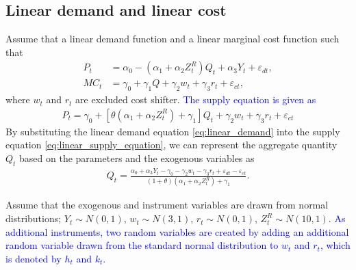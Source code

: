 \documentclass[11pt, a4paper]{article}
\begin{document}
\subsection{Linear demand and linear cost}
Assume that a linear demand function and a linear marginal cost function such that
\begin{align}
    P_t &= \alpha_0 - (\alpha_1 + \alpha_2Z^R_t)Q_t + \alpha_3 Y_t + \varepsilon_{dt},\label{eq:linear_demand}\\
    MC_t &= \gamma_0  + \gamma_1 Q + \gamma_2 w_t + \gamma_3 r_t + \varepsilon_{ct},\label{eq:linear_marginal_cost}
\end{align}
where $w_t$ and $r_t$ are excluded cost shifter.
\textcolor{blue}{The supply equation is given as}
\begin{align}
    P_t = \gamma_0 + [\theta(\alpha_1 + \alpha_2Z^R_t)+ \gamma_1] Q_t   + \gamma_2 w_t + \gamma_3 r_t + \varepsilon_{ct}\label{eq:linear_supply_equation}
\end{align}
By substituting the linear demand equation \eqref{eq:linear_demand} into the supply equation \eqref{eq:linear_supply_equation}, we can represent the aggregate quantity $Q_t$ based on the parameters and the exogenous variables as   
\begin{align}
    Q_t =  \frac{\alpha_0 + \alpha_3 Y_t - \gamma_0 - \gamma_2 w_t - \gamma_3 r_t + \varepsilon_{dt} - \varepsilon_{ct}}{(1 + \theta) (\alpha_1 + \alpha_2Z^R_t) + \gamma_1}.
\end{align}

Assume that the exogenous and instrument variables are drawn from normal distributions; $ Y_t \sim N(0,1)$, $w_t \sim N (3, 1)$, $r_t \sim N (0, 1)$, $ Z^R_t \sim N (10, 1)$.
\textcolor{blue}{As additional instruments, two random variables are created by adding an additional random variable drawn from the standard normal distribution to $w_t$ and $r_t$, which is denoted by $h_t$ and $k_t$.}
\end{document}
